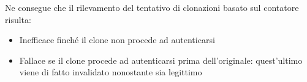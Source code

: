 Ne consegue che il rilevamento del tentativo di clonazioni basato sul contatore risulta:
\begin{itemize}
	\item Inefficace finché il clone non procede ad autenticarsi
	\item Fallace se il clone procede ad autenticarsi prima dell'originale: quest'ultimo viene di fatto invalidato nonostante sia legittimo
\end{itemize} 